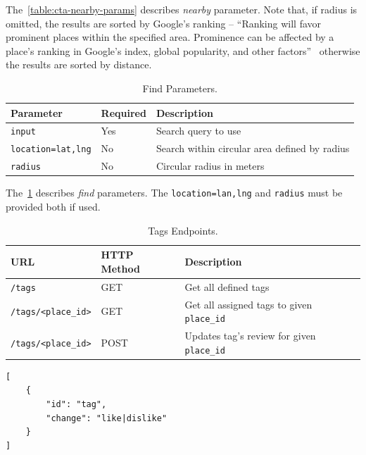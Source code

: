The~\cref{table:cta-nearby-params} describes \textit{nearby} parameter. Note that, if radius is omitted, the results are sorted by Google's ranking -- ``Ranking will favor prominent places within the specified area. Prominence can be affected by a place's ranking in Google's index, global popularity, and other factors''~\cite{google-places-api-nearby-req} otherwise the results are sorted by distance. 
\begin{table}[ht]
\centering
\begin{tabularx}{\textwidth}{|l|l|X|}
\hline
\textbf{Parameter} & \textbf{Required} & \textbf{Description} \\ \hline
\verb|input| & Yes & Search query to use \\ \hline
\verb|location=lat,lng| & No & Search within circular area defined by radius \\ \hline
\verb|radius| & No & Circular radius in meters\\ \hline
\end{tabularx}
\caption{Find Parameters.}
\label{table:cta-find-params}
\end{table}

The~\cref{table:cta-find-params} describes \textit{find} parameters. The \verb|location=lan,lng| and \verb|radius| must be provided both if used. 
\begin{table}[ht]
\centering
\begin{tabularx}{\textwidth}{|l|l|X|}
\hline
\textbf{URL} & \textbf{HTTP Method} & \textbf{Description} \\ \hline
\verb|/tags| & GET & Get all defined tags \\ \hline
\verb|/tags/<place_id>| & GET & Get all assigned tags to given \verb|place_id| \\ \hline
\verb|/tags/<place_id>| & POST & Updates tag's review for given \verb|place_id| \\ \hline
\end{tabularx}
\caption{Tags Endpoints.}
\label{table:cta-tags}
\end{table}

\begin{listing}[ht]
\begin{verbatim}
[
    {
        "id": "tag",
        "change": "like|dislike"
    }
]
\end{verbatim}
\caption{Tag Update Content Example.}
\label{listing:tag-update-post}
\end{listing}


